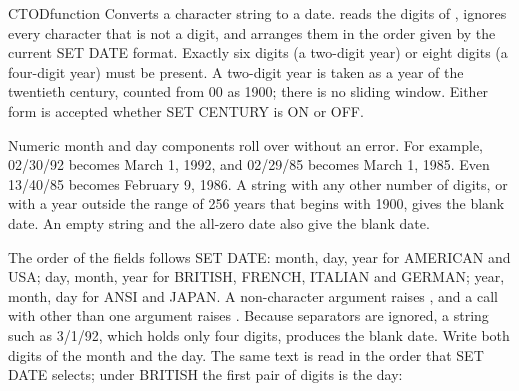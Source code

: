 \begin{XbaseEntry}{CTOD}{function}
Converts a character string to a date.
\Syntax
{}
\Usage
{} reads the digits of , ignores every character that is not a digit, and arranges them in the order given by the current SET DATE format. Exactly six digits (a two-digit year) or eight digits (a four-digit year) must be present. A two-digit year is taken as a year of the twentieth century, counted from 00 as 1900; there is no sliding window. Either form is accepted whether SET CENTURY is ON or OFF.

Numeric month and day components roll over without an error. For example, 02/30/92 becomes March 1, 1992, and 02/29/85 becomes March 1, 1985. Even 13/40/85 becomes February 9, 1986. A string with any other number of digits, or with a year outside the range of 256 years that begins with 1900, gives the blank date. An empty string and the all-zero date also give the blank date.

The order of the fields follows SET DATE: month, day, year for AMERICAN and USA; day, month, year for BRITISH, FRENCH, ITALIAN and GERMAN; year, month, day for ANSI and JAPAN. A non-character argument raises , and a call with other than one argument raises .
\Tips
Because separators are ignored, a string such as 3/1/92, which holds only four digits, produces the blank date. Write both digits of the month and the day.
\Examples
{}
The same text is read in the order that SET DATE selects; under BRITISH the first pair of digits is the day:
\end{XbaseEntry}

